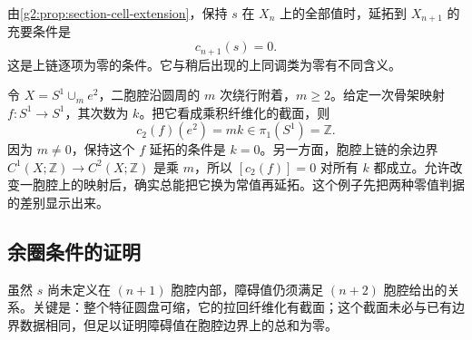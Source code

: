 由\cref{g2:prop:section-cell-extension}，保持 \(s\) 在 \(X_n\) 上的全部值时，延拓到 \(X_{n+1}\) 的充要条件是
\begin{equation}\label{g2:eq:obstruction-cochain-vanishing}
	c_{n+1}(s)=0.
\end{equation}
这是上链逐项为零的条件。它与稍后出现的上同调类为零有不同含义。

\begin{example}\label{g2:exm:obstruction-relation-cochain}
	令 \(X=S^1\cup_m e^2\)，二胞腔沿圆周的 \(m\) 次绕行附着，\(m\ge2\)。给定一次骨架映射 \(f:S^1\to S^1\)，其次数为 \(k\)。把它看成乘积纤维化的截面，则
	\[
		c_2(f)(e^2)=mk\in\pi_1(S^1)=\mathbb Z.
	\]
	因为 \(m\ne0\)，保持这个 \(f\) 延拓的条件是 \(k=0\)。另一方面，胞腔上链的余边界 \(C^1(X;\mathbb Z)\to C^2(X;\mathbb Z)\) 是乘 \(m\)，所以 \([c_2(f)]=0\) 对所有 \(k\) 都成立。允许改变一胞腔上的映射后，确实总能把它换为常值再延拓。这个例子先把两种零值判据的差别显示出来。
\end{example}

\subsection{余圈条件的证明}
\label{g2:subsec:1202:02}

虽然 \(s\) 尚未定义在 \((n+1)\) 胞腔内部，障碍值仍须满足 \((n+2)\) 胞腔给出的关系。关键是：整个特征圆盘可缩，它的拉回纤维化有截面；这个截面未必与已有边界数据相同，但足以证明障碍值在胞腔边界上的总和为零。

